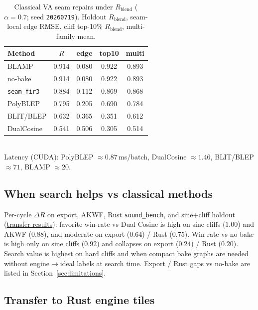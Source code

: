 \begin{table}[t]
  \centering
  \caption{Classical VA seam repairs under $R_{\mathrm{blend}}$ ($\alpha{=}0.7$; seed \texttt{20260719}).
  Holdout $R_{\mathrm{blend}}$, seam-local edge RMSE, cliff top-10\% $R_{\mathrm{blend}}$, multi-family mean.}
  \label{tab:va-seam-blep}
  \setlength{\tabcolsep}{3pt}
  \footnotesize
  \begin{tabular}{@{}lcccc@{}}
    \toprule
    Method & $R$ & edge & top10 & multi \\
    \midrule
    BLAMP & 0.914 & 0.080 & 0.922 & 0.893 \\
    no-bake & 0.914 & 0.080 & 0.922 & 0.893 \\
    \texttt{seam\_fir3} & 0.884 & 0.112 & 0.869 & 0.868 \\
    PolyBLEP & 0.795 & 0.205 & 0.690 & 0.784 \\
    BLIT/BLEP & 0.632 & 0.365 & 0.351 & 0.612 \\
    DualCosine & 0.541 & 0.506 & 0.305 & 0.514 \\
    \bottomrule
  \end{tabular}\\[0.35em]
  {\footnotesize Latency (CUDA): PolyBLEP ${\approx}0.87$\,ms/batch, DualCosine ${\approx}1.46$, BLIT/BLEP ${\approx}71$, BLAMP ${\approx}20$.}
\end{table}





\subsection{When search helps vs classical methods}
\label{sec:transfer}

Per-cycle $\Delta R$ on export, AKWF, Rust \texttt{sound\_bench}, and sine{+}cliff holdout
(\href{https://github.com/reeldemo/denoise-opt}{transfer results}):
favorite win-rate vs Dual Cosine is high on sine cliffs ($1.00$) and AKWF ($0.88$), and moderate on export ($0.64$) / Rust ($0.75$).
Win-rate vs no-bake is high only on sine cliffs ($0.92$) and collapses on export ($0.24$) / Rust ($0.20$).
Search value is highest on hard cliffs and when compact bake graphs are needed without engine$\to$ideal labels at search time.
Export / Rust gaps vs no-bake are listed in Section~\ref{sec:limitations}.

\subsection{Transfer to Rust engine tiles}
\label{sec:rust-bench}

